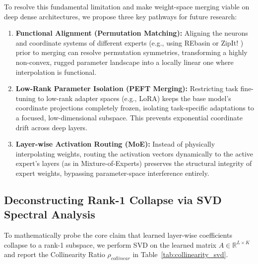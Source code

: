 To resolve this fundamental limitation and make weight-space merging viable on deep dense architectures, we propose three key pathways for future research:
\begin{enumerate}
    \item \textbf{Functional Alignment (Permutation Matching):} Aligning the neurons and coordinate systems of different experts (e.g., using REbasin \cite{ainsworth2022gitrebasin} or ZipIt! \cite{stoica2023zipit}) prior to merging can resolve permutation symmetries, transforming a highly non-convex, rugged parameter landscape into a locally linear one where interpolation is functional.
    \item \textbf{Low-Rank Parameter Isolation (PEFT Merging):} Restricting task fine-tuning to low-rank adapter spaces (e.g., LoRA) keeps the base model's coordinate projections completely frozen, isolating task-specific adaptations to a focused, low-dimensional subspace. This prevents exponential coordinate drift across deep layers.
    \item \textbf{Layer-wise Activation Routing (MoE):} Instead of physically interpolating weights, routing the activation vectors dynamically to the active expert's layers (as in Mixture-of-Experts) preserves the structural integrity of expert weights, bypassing parameter-space interference entirely.
\end{enumerate}

\subsection{Deconstructing Rank-1 Collapse via SVD Spectral Analysis}

To mathematically probe the core claim that learned layer-wise coefficients collapse to a rank-1 subspace, we perform SVD on the learned matrix $A \in \mathbb{R}^{L \times K}$ and report the Collinearity Ratio $\rho_{collinear}$ in Table~\ref{tab:collinearity_svd}.

